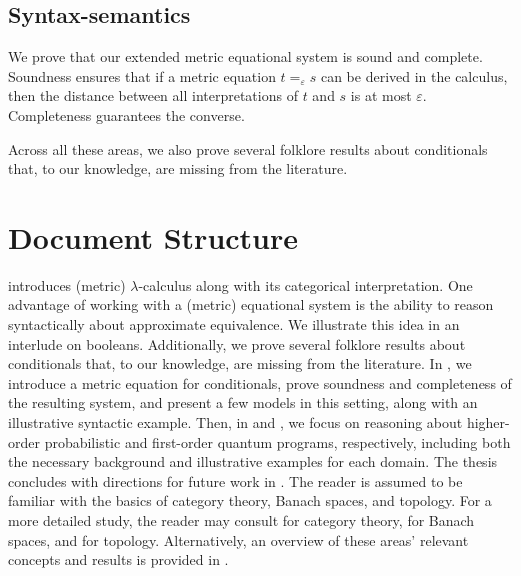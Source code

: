 \subsection*{Syntax-semantics}
We prove that our extended metric equational system is sound and complete. Soundness ensures that if a metric equation $t =_{\varepsilon} s$ can be derived in the calculus, then the distance between all interpretations of $t$ and $s$ is at most $\varepsilon$. Completeness guarantees the converse.

\vspace{10pt}
Across all these areas, we also prove several folklore results about conditionals that, to our knowledge, are missing from the literature.




\section{Document Structure}

 introduces (metric) $\lambda$-calculus along with its categorical interpretation. One advantage of working with a (metric) equational system is the ability to reason syntactically about approximate equivalence. We illustrate this idea in an interlude on booleans. Additionally, we prove several folklore results about conditionals that, to our knowledge, are missing from the literature.
 In , we introduce a metric equation for conditionals, prove soundness and completeness of the resulting system, and present a few models in this setting, along with an illustrative syntactic example. 
 Then, in  and , we focus on reasoning about higher-order probabilistic and first-order quantum programs, respectively, including both the necessary background and illustrative examples for each domain.
 The thesis concludes with directions for future work in . 
The reader is assumed to be familiar with the basics of category theory, Banach spaces, and topology. For a more detailed study, the reader may consult \cite{awodeyCategoryTheory2010} for category theory, \cite[Chapters~1--2]{kreyszigIntroductoryFunctionalAnalysis2007} for Banach spaces, and \cite[Chapters~2~and~5]{guide2006infinite} for topology. Alternatively, an overview of these areas' relevant concepts and results is provided in .




